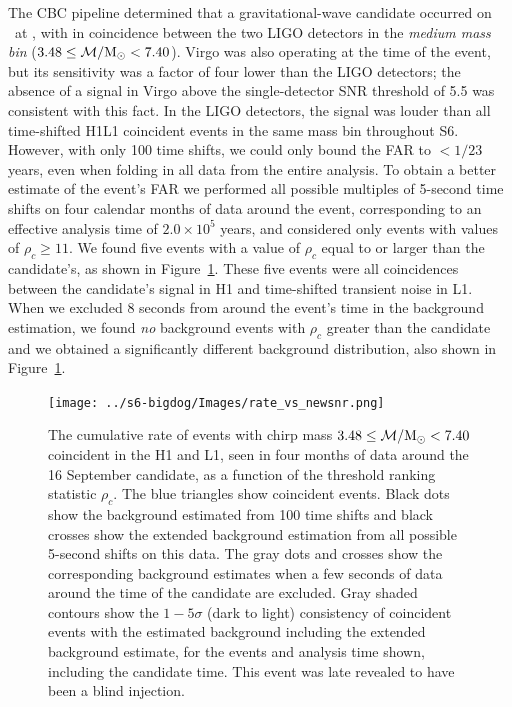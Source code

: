 
The \ac{CBC} pipeline determined that a gravitational-wave candidate occurred
on \dogDate~at \recoveredDogTime, with \dogSNR in
coincidence between the two LIGO detectors in the {\it medium mass bin} ($3.48
\le \mathcal{M}/\mathrm{M_\odot} < 7.40$).  Virgo was also operating at the time of the
event, but its sensitivity was a factor of four lower than the LIGO detectors;
the absence of a signal in Virgo above the single-detector SNR threshold of 5.5
was consistent with this fact.  In the LIGO detectors, the signal was louder
than all time-shifted H1L1 coincident events in the same mass bin throughout
\ac{S6}. However, with only 100 time shifts, we could only bound the FAR to $<
1/23$ years, even when folding in all data from the entire analysis. To obtain
a better estimate of the event's FAR we performed all possible multiples of
5-second time shifts on four calendar months of data around the event,
corresponding to an effective analysis time of $2.0\times 10^5$
years, and considered only events with values of $\rho_{c} \ge 11$.  We found
five events with a value of $\rho_c$ equal to or larger than the
candidate's, as shown in Figure~\ref{fig:far}.  These five events were all
coincidences between the candidate's signal in H1 and time-shifted transient
noise in L1.  When we excluded 8 seconds from around the event's time in the
background estimation, we found {\em no}\/ background events with $\rho_c$
greater than the candidate and we obtained a significantly different background
distribution, also shown in Figure~\ref{fig:far}. 

\begin{figure}[tp]
\texttt{[image: ../s6-bigdog/Images/rate\_vs\_newsnr.png]}
\caption{ The cumulative rate of events with chirp mass $3.48 \le
\mathcal{M}/\mathrm{M_\odot} < 7.40$ coincident in the H1 and L1, seen in four
months of data around the 16 September candidate, as a function of the
threshold ranking statistic $\rho_c$.  The blue triangles show
coincident events.  Black dots show the background estimated from 100
time shifts and black crosses show the extended background estimation
from all possible 5-second shifts on this data.  The gray dots and
crosses show the corresponding background estimates when a few seconds
of data around the time of the candidate are excluded.  Gray shaded
contours show the $1 - 5\sigma$ (dark to light) consistency of
coincident events with the estimated background including the extended
background estimate, for the events and analysis time shown, including
the candidate time.  This event was late revealed to have been a blind
injection. }
\label{fig:far}
\end{figure}


